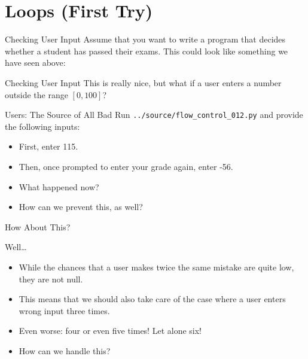 \documentclass[aspectratio=169, 12pt, xcolor=table]{beamer}
\begin{document}
	\section{Loops (First Try)}\label{sec:loops--first-try}
	
	\sectionframe
	
	\begin{frame}{Checking User Input}
		Assume that you want to write a program that decides whether a student has passed their exams. This could look like something we have seen above:
		
	\end{frame}

	\begin{frame}{Checking User Input}
		This is really nice, but what if a user enters a number outside the range $[0,100]$?\pause
		
	\end{frame}

	\begin{frame}{Users: The Source of All Bad}
		Run \texttt{../source/flow\_control\_012.py} and provide the following inputs:
		\begin{itemize}
			\item First, enter 115.
			\item Then, once prompted to enter your grade again, enter -56.
			\item What happened now?
			\item How can we prevent this, as well?
		\end{itemize}
	\end{frame}
	
	\begin{frame}{How About This?}
		
	\end{frame}

	\begin{frame}{Well\ldots}
		\begin{itemize}
			\item While the chances that a user makes twice the same mistake are quite low, they are not null.
			\item This means that we should also take care of the case where a user enters wrong input three times.
			\item Even worse: four or even five times! Let alone six!
			\item How can we handle this?
		\end{itemize}
	\end{frame}
\end{document}
